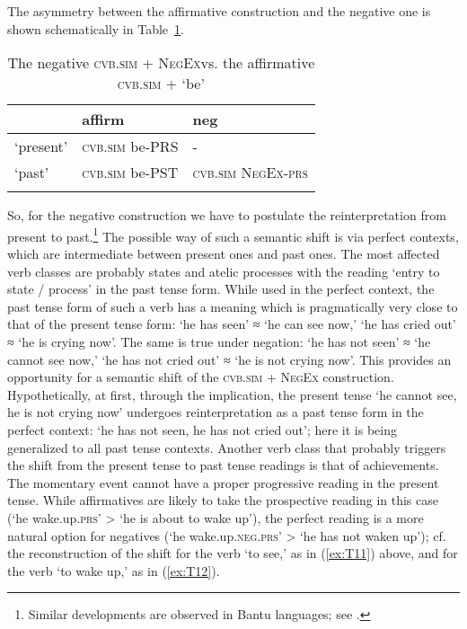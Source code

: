 \documentclass[output=paper]{langscibook}
\begin{document}
The asymmetry between the affirmative construction and the negative one is shown schematically in Table \ref{tab:T10}.

\begin{table}[!h]
    \caption{The negative \textsc{cvb.sim + NegEx}vs. the affirmative \textsc{cvb.sim} + ‘be’}
    \label{tab:T10}
    \begin{tabular}{@{}lll@{}}
    \lsptoprule
     & affirm & neg \\ \midrule
    ‘present’ & \textsc{cvb.sim} be-PRS & -\footnotemark \\
    ‘past’ & \textsc{cvb.sim} be-PST & \textsc{cvb.sim NegEx-prs} \\ \lspbottomrule
    \end{tabular}
    \end{table}


So, for the negative construction we have to postulate the reinterpretation from present to past.\footnote{Similar developments are observed in Bantu languages; see \citet[148]{Nurse2008}.} The possible way of such a semantic shift is via perfect contexts, which are intermediate between present ones and past ones. The most affected verb classes are probably states and atelic processes with the reading ‘entry to state / process’ in the past tense form. While used in the perfect context, the past tense form of such a verb has a meaning which is pragmatically very close to that of the present tense form: ‘he has seen’ ≈ ‘he can see now,’ ‘he has cried out’ ≈ ‘he is crying now’. The same is true under negation: ‘he has not seen’ ≈ ‘he cannot see now,’ ‘he has not cried out’ ≈ ‘he is not crying now’. This provides an opportunity for a semantic shift of the \textsc{cvb.sim + NegEx} construction. Hypothetically, at first, through the implication, the present tense ‘he cannot see, he is not crying now’ undergoes reinterpretation as a past tense form in the perfect context: ‘he has not seen, he has not cried out’; here it is being generalized to all past tense contexts. Another verb class that probably triggers the shift from the present tense to past tense readings is that of achievements. The momentary event cannot have a proper progressive reading in the present tense. While affirmatives are likely to take the prospective reading in this case (‘he wake.up.\textsc{prs}’ > ‘he is about to wake up’), the perfect reading is a more natural option for negatives (‘he wake.up.\textsc{neg.prs}’ > ‘he has not waken up’); cf. the reconstruction of the shift for the verb ‘to see,’ as in (\ref{ex:T11}) above, and for the verb ‘to wake up,’ as in (\ref{ex:T12}).
\end{document}
